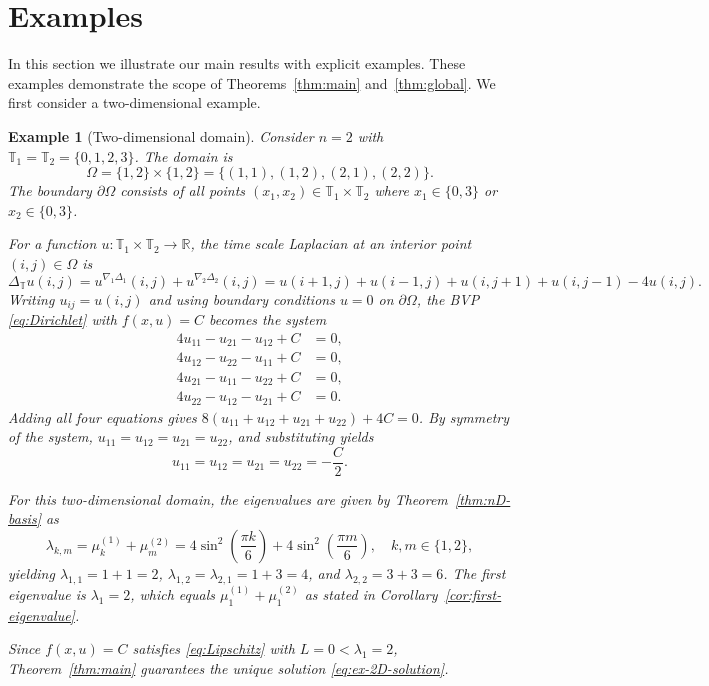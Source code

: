 \documentclass{article}
\newtheorem{example}[theorem]{Example}
\numberwithin{equation}{section}
\numberwithin{theorem}{section}
\begin{document}
\section{Examples}\label{sec:examples}

In this section we illustrate our main results with explicit examples. These examples demonstrate the scope of Theorems~\ref{thm:main} and~\ref{thm:global}. We first consider a two-dimensional example.
\begin{example}[Two-dimensional domain]\label{ex:2D}
Consider $n = 2$ with $\mathbb{T}_1 = \mathbb{T}_2 = \{0, 1, 2, 3\}$. The domain is
\[\Omega = \{1, 2\} \times \{1, 2\} = \{(1,1), (1,2), (2,1), (2,2)\}.\]
The boundary $\partial\Omega$ consists of all points $(x_1, x_2) \in \mathbb{T}_1 \times \mathbb{T}_2$ where $x_1 \in \{0, 3\}$ or $x_2 \in \{0, 3\}$.

For a function $u\colon \mathbb{T}_1 \times \mathbb{T}_2 \to \mathbb{R}$, the time scale Laplacian at an interior point $(i, j) \in \Omega$ is
\[\Delta_{\mathbb{T}} u(i,j) = u^{\nabla_1\Delta_1}(i,j) + u^{\nabla_2\Delta_2}(i,j) = u(i+1,j) + u(i-1,j) + u(i,j+1) + u(i,j-1) - 4u(i,j).\]
Writing $u_{ij} = u(i,j)$ and using boundary conditions $u = 0$ on $\partial\Omega$, the BVP \eqref{eq:Dirichlet} with $f(x, u) = C$ becomes the system
\[\begin{aligned}
4u_{11} - u_{21} - u_{12} + C &= 0,\\
4u_{12} - u_{22} - u_{11} + C &= 0,\\
4u_{21} - u_{11} - u_{22} + C &= 0,\\
4u_{22} - u_{12} - u_{21} + C &= 0.
\end{aligned}\]
Adding all four equations gives $8(u_{11} + u_{12} + u_{21} + u_{22}) + 4C = 0$. By symmetry of the system, $u_{11} = u_{12} = u_{21} = u_{22}$, and substituting yields
\begin{equation}\label{eq:ex-2D-solution}
u_{11} = u_{12} = u_{21} = u_{22} = -\frac{C}{2}.
\end{equation}

For this two-dimensional domain, the eigenvalues are given by Theorem~\ref{thm:nD-basis} as
\[\lambda_{k,m} = \mu_k^{(1)} + \mu_m^{(2)} = 4\sin^2\left(\frac{\pi k}{6}\right) + 4\sin^2\left(\frac{\pi m}{6}\right), \quad k, m \in \{1, 2\},\]
yielding $\lambda_{1,1} = 1 + 1 = 2$, $\lambda_{1,2} = \lambda_{2,1} = 1 + 3 = 4$, and $\lambda_{2,2} = 3 + 3 = 6$. The first eigenvalue is $\lambda_1 = 2$, which equals $\mu_1^{(1)} + \mu_1^{(2)}$ as stated in Corollary~\ref{cor:first-eigenvalue}.

Since $f(x,u) = C$ satisfies \eqref{eq:Lipschitz} with $L = 0 < \lambda_1 = 2$, Theorem~\ref{thm:main} guarantees the unique solution \eqref{eq:ex-2D-solution}. 
\end{example}
\end{document}
